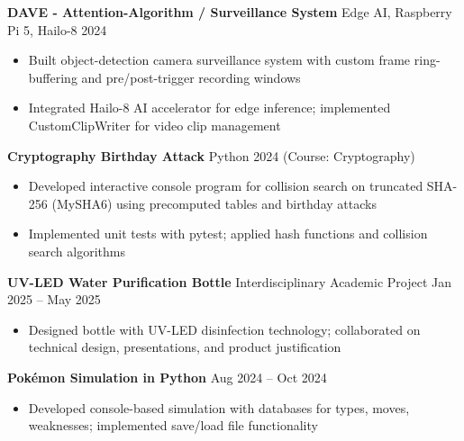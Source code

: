 \documentclass[11pt]{article}
\begin{document}
\vspace{6pt}

\textbf{DAVE - Attention-Algorithm / Surveillance System} \hfill Edge AI, Raspberry Pi 5, Hailo-8 \hfill 2024
\begin{itemize}[noitemsep, topsep=0pt, partopsep=0pt, parsep=0pt]
    \item Built object-detection camera surveillance system with custom frame ring-buffering and pre/post-trigger recording windows
    \item Integrated Hailo-8 AI accelerator for edge inference; implemented CustomClipWriter for video clip management
\end{itemize}

\vspace{6pt}

\textbf{Cryptography Birthday Attack} \hfill Python \hfill 2024 (Course: Cryptography)
\begin{itemize}[noitemsep, topsep=0pt, partopsep=0pt, parsep=0pt]
    \item Developed interactive console program for collision search on truncated SHA-256 (MySHA6) using precomputed tables and birthday attacks
    \item Implemented unit tests with pytest; applied hash functions and collision search algorithms
\end{itemize}

\vspace{6pt}

\textbf{UV-LED Water Purification Bottle} \hfill Interdisciplinary Academic Project \hfill Jan 2025 – May 2025
\begin{itemize}[noitemsep, topsep=0pt, partopsep=0pt, parsep=0pt]
    \item Designed bottle with UV-LED disinfection technology; collaborated on technical design, presentations, and product justification
\end{itemize}

\vspace{6pt}

\textbf{Pokémon Simulation in Python} \hfill Aug 2024 – Oct 2024
\begin{itemize}[noitemsep, topsep=0pt, partopsep=0pt, parsep=0pt]
    \item Developed console-based simulation with databases for types, moves, weaknesses; implemented save/load file functionality
\end{itemize}

\vspace{6pt}
\end{document}
